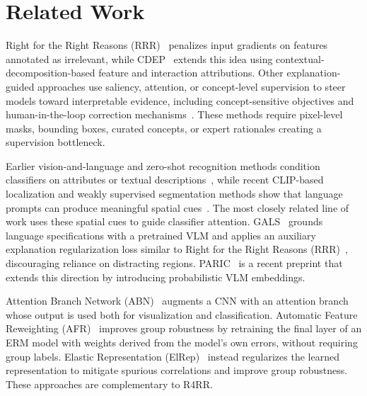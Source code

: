 \section{Related Work}
\label{sec:related}

Right for the Right Reasons (RRR)~\cite{ross2017right} penalizes input gradients on features annotated as irrelevant, while CDEP~\cite{rieger2020interpretations} extends this idea using contextual-decomposition-based feature and interaction attributions. Other explanation-guided approaches use saliency, attention, or concept-level supervision to steer models toward interpretable evidence, including concept-sensitive objectives and human-in-the-loop correction mechanisms~\cite{gupta2023concept,gao2022aligning,schramowski2020making}. These methods require pixel-level masks, bounding boxes, curated concepts, or expert rationales creating a supervision bottleneck.

Earlier vision-and-language and zero-shot recognition methods condition classifiers on attributes or textual descriptions~\cite{elhoseiny2013write,frome2013devise,lampert2013attribute,radford2021learning}, while recent CLIP-based localization and weakly supervised segmentation methods show that language prompts can produce meaningful spatial cues~\cite{lin2023clip,zhang2024frozen}. The most closely related line of work uses these spatial cues to guide classifier attention. GALS~\cite{petryk2022guiding} grounds language specifications with a pretrained VLM and applies an auxiliary explanation regularization loss similar to  Right for the Right Reasons (RRR)~\cite{ross2017right}, discouraging reliance on distracting regions. PARIC~\cite{nautiyal2025paric} is a recent preprint that extends this direction by introducing probabilistic VLM embeddings. %


Attention Branch Network (ABN)~\cite{fukui2019attention} augments a CNN with an attention branch whose output is used both for visualization and classification. Automatic Feature Reweighting (AFR)~\cite{qiu2023simple} improves group robustness by retraining the final layer of an ERM model with weights derived from the model's own errors, without requiring group labels. Elastic Representation (ElRep)~\cite{wen2025elastic} instead regularizes the learned representation to mitigate spurious correlations and improve group robustness. These approaches are complementary to R4RR.


